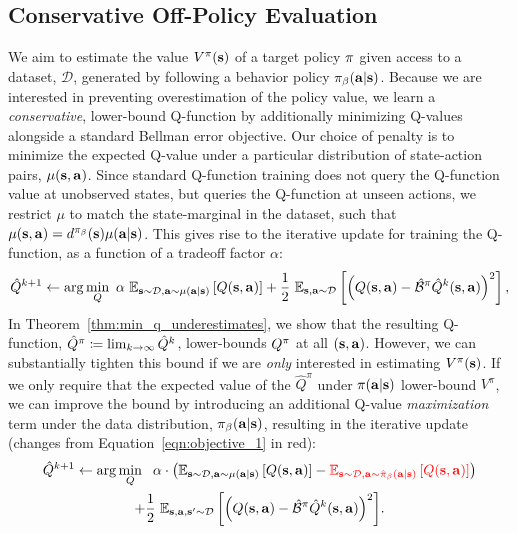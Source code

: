 \subsection{Conservative Off-Policy Evaluation}
\label{sec:policy_eval}
\vspace{-5pt}
We aim to estimate the value $V^\pi(\mathbf{s})$ of a target policy $\pi$ given access to a dataset, $\mathcal{D}$, generated by following a behavior policy ${\pi_\beta}(\mathbf{a}|\mathbf{s})$.
Because we are interested in preventing overestimation of the policy value, we learn a \textit{conservative}, lower-bound Q-function by additionally minimizing Q-values alongside a standard Bellman error objective.
Our choice of penalty is to minimize the expected Q-value under a particular distribution of state-action pairs, $\mu(\mathbf{s}, \mathbf{a})$. 
Since standard Q-function training does not query the Q-function value at unobserved states, but queries the Q-function at unseen actions, 
we restrict $\mu$ to match the state-marginal in the dataset,
such that $\mu(\mathbf{s}, \mathbf{a}) = d^{\pi_\beta}(\mathbf{s}) \mu(\mathbf{a}|\mathbf{s})$.
This gives rise to the iterative update for training the Q-function, as a function of a tradeoff factor $\alpha$:
\begin{equation}
    \small{\hat{Q}^{k+1} \leftarrow \arg\min_{Q}~ \alpha~ \mathbb{E}_{\mathbf{s}\sim \mathcal{D}, \mathbf{a}\sim \mu(\mathbf{a}|\mathbf{s})}\left[Q(\mathbf{s}, \mathbf{a})\right] + \frac{1}{2}~ \mathbb{E}_{\mathbf{s}, \mathbf{a}\sim \mathcal{D}}\left[\left(Q(\mathbf{s}, \mathbf{a}) - \hat{\mathcal{B}}^\pi\hat{Q}^{k} (\mathbf{s}, \mathbf{a}) \right)^2 \right],} 
    \label{eqn:objective_1}
\end{equation}
In Theorem~\ref{thm:min_q_underestimates}, we show that the resulting Q-function, $\hat{Q}^\pi \coloneqq \lim_{k \rightarrow \infty} \hat{Q}^k$, lower-bounds $Q^\pi$ at all $(\mathbf{s},\mathbf{a})$. 
However, we can substantially tighten this bound
if we are \textit{only} interested in estimating  $V^\pi(\mathbf{s})$. If we only require that the expected value of the $\hat{Q}^\pi$ under $\pi(\mathbf{a}|\mathbf{s})$ lower-bound $V^\pi$, we can improve the bound by introducing an additional Q-value \textit{maximization} term under the data distribution, ${\pi_\beta}(\mathbf{a}|\mathbf{s})$, resulting in the iterative update (changes from Equation~\ref{eqn:objective_1} in red):
\begin{multline}
    \small{\hat{Q}^{k+1} \leftarrow \arg\min_{Q}~~ \alpha \cdot \left(\mathbb{E}_{\mathbf{s}\sim \mathcal{D}, \mathbf{a}\sim \mu(\mathbf{a}|\mathbf{s})}\left[Q(\mathbf{s}, \mathbf{a})\right] - \textcolor{red}{\mathbb{E}_{\mathbf{s}\sim \mathcal{D}, \mathbf{a}\sim \hat{\pi}_\beta(\mathbf{a}|\mathbf{s})}\left[Q(\mathbf{s}, \mathbf{a})\right]} \right)} \\
    \small{+ \frac{1}{2}~ \mathbb{E}_{\mathbf{s}, \mathbf{a}, \mathbf{s}' \sim \mathcal{D}}\left[\left(Q(\mathbf{s}, \mathbf{a}) - \hat{\mathcal{B}}^\pi\hat{Q}^{k} (\mathbf{s}, \mathbf{a}) \right)^2 \right]}.
    \label{eqn:modified_policy_eval}
\end{multline}
